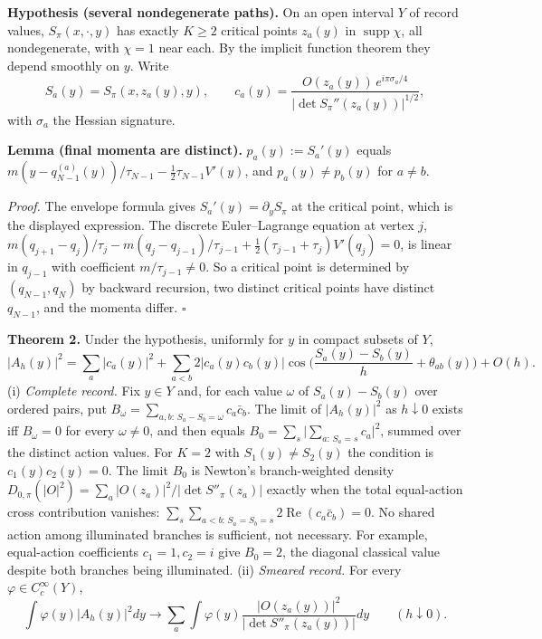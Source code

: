 \documentclass[11pt,a4paper]{article}
\begin{document}
\textbf{Hypothesis (several nondegenerate paths).} On an open interval
\(Y\) of record values, \(S_\pi(x,\cdot,y)\) has exactly \(K\ge2\)
critical points \(z_a(y)\) in \(\operatorname{supp}\chi\), all
nondegenerate, with \(\chi=1\) near each. By the implicit function
theorem they depend smoothly on \(y\). Write
\[S_a(y)=S_\pi(x,z_a(y),y),\qquad
c_a(y)=\frac{O(z_a(y))\,e^{i\pi\sigma_a/4}}{|\det S_\pi''(z_a(y))|^{1/2}},\tag{2}\]
with \(\sigma_a\) the Hessian signature.

\textbf{Lemma (final momenta are distinct).} \(p_a(y):=S_a'(y)\) equals
\(m(y-q^{(a)}_{N-1}(y))/\tau_{N-1}-\tfrac12\tau_{N-1}V'(y)\), and
\(p_a(y)\neq p_b(y)\) for \(a\neq b\).

\emph{Proof.} The envelope formula gives \(S_a'(y)=\partial_yS_\pi\) at
the critical point, which is the displayed expression. The discrete
Euler--Lagrange equation at vertex \(j\),
\(m(q_{j+1}-q_j)/\tau_j-m(q_j-q_{j-1})/\tau_{j-1} +\tfrac12(\tau_{j-1}+\tau_j)V'(q_j)=0\),
is linear in \(q_{j-1}\) with coefficient \(m/\tau_{j-1}\ne0\). So a
critical point is determined by \((q_{N-1},q_N)\) by backward recursion,
two distinct critical points have distinct \(q_{N-1}\), and the momenta
differ. \(\square\)

\textbf{Theorem 2.} Under the hypothesis, uniformly for \(y\) in compact
subsets of \(Y\), \[|A_h(y)|^2=\sum_a|c_a(y)|^2
+\sum_{a<b}2|c_a(y)c_b(y)|\cos\!\Big(\frac{S_a(y)-S_b(y)}{h}+\theta_{ab}(y)\Big)
+O(h).\tag{3}\] (i) \emph{Complete record.} Fix \(y\in Y\) and, for each
value \(\omega\) of \(S_a(y)-S_b(y)\) over ordered pairs, put
\(B_\omega=\sum_{a,b:\,S_a-S_b=\omega}c_a\bar c_b\). The limit of
\(|A_h(y)|^2\) as \(h\downarrow0\) exists iff \(B_\omega=0\) for every
\(\omega\neq0\), and then equals
\(B_0=\sum_{s}\big|\sum_{a:\,S_a=s}c_a\big|^2\), summed over the
distinct action values. For \(K=2\) with \(S_1(y)\neq S_2(y)\) the
condition is \(c_1(y)c_2(y)=0\). The limit \(B_0\) is Newton's
branch-weighted density
\(D_{0,\pi}(|O|^2)=\sum_a|O(z_a)|^2/|\det S''_\pi(z_a)|\) exactly when
the total equal-action cross contribution vanishes:
\(\sum_s\sum_{a<b:\,S_a=S_b=s}2\operatorname{Re}(c_a\bar c_b)=0\). No
shared action among illuminated branches is sufficient, not necessary.
For example, equal-action coefficients \(c_1=1,c_2=i\) give \(B_0=2\),
the diagonal classical value despite both branches being illuminated.
(ii) \emph{Smeared record.} For every \(\varphi\in C_c^\infty(Y)\),
\[\int\varphi(y)|A_h(y)|^2dy\longrightarrow
\sum_a\int\varphi(y)\frac{|O(z_a(y))|^2}{|\det S''_\pi(z_a(y))|}dy
\qquad(h\downarrow0).\tag{4}\]
\end{document}
